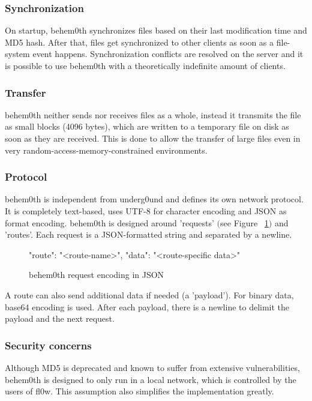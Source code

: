 \documentclass[conference,a4paper]{IEEEtran}
\begin{document}
\subsubsection{Synchronization}
On startup, behem0th\cite{behem0th:Christoph Heiss} synchronizes files based on their last modification time and MD5 hash. After that, files get synchronized to other clients as soon as a file-system event happens. Synchronization conflicts are resolved on the server and it is possible to use behem0th with a theoretically indefinite amount of clients.\\

\subsubsection{Transfer}
behem0th\cite{behem0th:Christoph Heiss} neither sends nor receives files as a whole, instead it transmits the file as small blocks (4096 bytes), which are written to a temporary file on disk as soon as they are received. This is done to allow the transfer of large files even in very random-access-memory-constrained environments.\\

\subsubsection{Protocol}
behem0th\cite{behem0th:Christoph Heiss} is independent from underg0und and defines its own network protocol. It is completely text-based, uses UTF-8 for character encoding and JSON\cite{JSON:T. Bray Ed.} as format encoding. behem0th is designed around 'requests' $($see Figure ~\ref{fig:behem0th_request}$)$ and 'routes'. Each request is a JSON-formatted string and separated by a newline.

\begin{figure}[H]
\centering
\begin{json}
{
    "route": "<route-name>",
    "data": "<route-specific data>"
}
\end{json}
\caption{behem0th request encoding in JSON\cite{JSON:T. Bray Ed.}}
\label{fig:behem0th_request}
\end{figure}

A route can also send additional data if needed (a 'payload'). For binary data, base64\cite{Base64:S. Josefsson} encoding is used. After each payload, there is a newline to delimit the payload and the next request. \\

\subsubsection{Security concerns}
Although MD5 is deprecated and known to suffer from extensive vulnerabilities, behem0th\cite{behem0th:Christoph Heiss} is designed to only run in a local network, which is controlled by the users of fl0w\cite{fl0w:Philip Trauner}. This assumption also simplifies the implementation greatly.
\end{document}

